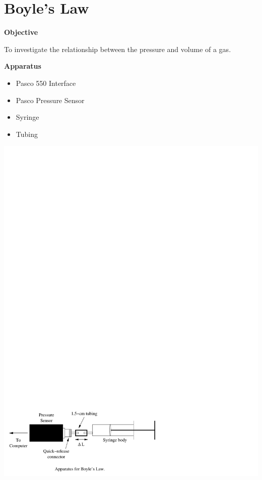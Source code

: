 \section{Boyle's Law}
\label{lab_boyles_law}

\makelabheader %

\textbf{Objective}

To investigate the relationship between the pressure and volume of
a gas.

\textbf{Apparatus}

\begin{itemize}
\item Pasco 550 Interface
\item Pasco Pressure Sensor
\item Syringe
\item Tubing
\end{itemize}
\vspace{0.3cm}
{\par\centering \includegraphics{boyles_law/boyleslawfig1.pdf} \par}
\vspace{0.3cm}

